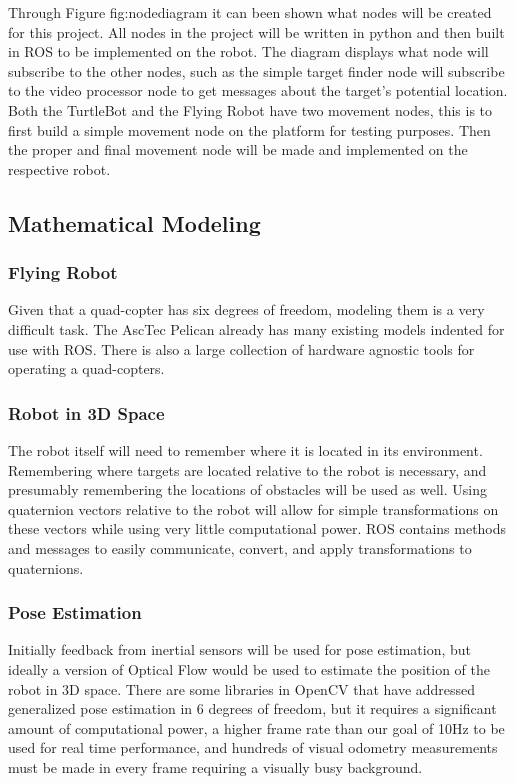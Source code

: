 \documentclass{article}
\begin{document}
Through Figure {fig:nodediagram} it can been shown what nodes will be created for this project. All nodes in the project will be written in python and then built in ROS to be implemented on the robot. The diagram displays what node will subscribe to the other nodes, such as the simple target finder node will subscribe to the video processor node to get messages about the target's potential location. Both the TurtleBot and the Flying Robot have two movement nodes, this is to first build a simple movement node on the platform for testing purposes. Then the proper and final movement node will be made and implemented on the respective robot. 
	
	\subsection{Mathematical Modeling}
	
		\subsubsection{Flying Robot}
	
	Given that a quad-copter has six degrees of freedom, modeling them is a very difficult task. The AscTec Pelican already has many existing models indented for use with ROS. There is also a large collection of hardware agnostic tools for operating a quad-copters.
	
		\subsubsection{Robot in 3D Space}
	
	The robot itself will need to remember where it is located in its environment. Remembering where targets are located relative to the robot is necessary, and presumably remembering the locations of obstacles will be used as well. Using quaternion vectors relative to the robot will allow for simple transformations on these vectors while using very little computational power. ROS contains methods and messages to easily communicate, convert, and apply transformations to quaternions.
	
		\subsubsection{Pose Estimation}
	
	Initially feedback from inertial sensors will be used for pose estimation, but ideally a version of Optical Flow would be used to estimate the position of the robot in 3D space. There are some libraries in OpenCV that have addressed generalized pose estimation in 6 degrees of freedom, but it requires a significant amount of computational power, a higher frame rate than our goal of 10Hz to be used for real time performance, and hundreds of visual odometry measurements must be made in every frame requiring a visually busy background.
\end{document}
